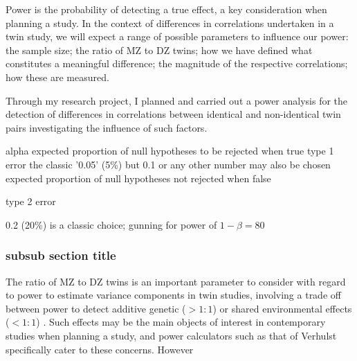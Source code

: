Power is the probability of detecting a true effect, a key consideration when planning a study.  In the context of differences in correlations undertaken in a twin study, we will expect a range of possible parameters to influence our power: the sample size; the ratio of MZ to DZ twins; how we have defined what constitutes a meaningful difference; the magnitude of the respective correlations; how these are measured.

Through my research project, I planned and carried out a power analysis for the detection of differences in correlations between identical and non-identical twin pairs investigating the influence of such factors.  


alpha  expected proportion of null hypotheses to be rejected when true 
type 1 error
the classic '0.05' (5\%)\; but 0.1 or any other number may also be chosen 
 expected proportion of null hypotheses not rejected when false 
      \item type 2 error
      \item 0.2 (20\%) is a classic choice; gunning for power of \(1 - \beta = 80\)
      
      
 \subsubsection{subsub section title}
 
The ratio of MZ to DZ twins is an important parameter to consider with regard to power to estimate variance components in twin studies, involving a trade off between power to detect additive genetic ($>1:1$) or shared environmental effects ($<1:1$) \cite{Visscher2008}.  Such effects may be the main objects of interest in contemporary studies when planning a study, and power calculators such as that of Verhulst \cite{Verhulst2017} specifically cater to these concerns.  However




